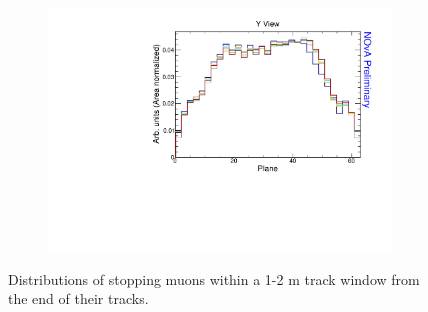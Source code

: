 \begin{figure}[ht!]
\begin{subfigure}{0.495\textwidth}
  \end{subfigure}
  \begin{subfigure}{0.495\textwidth}
    \includegraphics[width=\linewidth]{essentialsec_tb/nhits_plane_y.pdf}
  \end{subfigure}
    \caption{Distributions of stopping muons within a 1-2 m track window from the end of their tracks.}
\end{figure}
